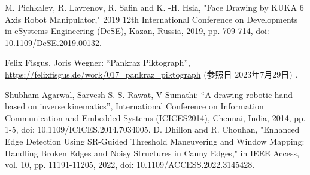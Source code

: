 \documentclass[10pt]{jarticle}
\begin{document}
    \vspace{5truemm}
    {\footnotesize
        \begin{thebibliography}{99}
            
            M. Pichkalev, R. Lavrenov, R. Safin and K. -H. Hsia, "Face Drawing by KUKA 6 Axis Robot Manipulator," 2019 12th International Conference on Developments in eSystems Engineering (DeSE), Kazan, Russia, 2019, pp. 709-714, doi: 10.1109/DeSE.2019.00132.

            Felix Fisgus, Joris Wegner: ``Pankraz Piktograph'', 
            \url{https://felixfisgus.de/work/017\_pankraz\_piktograph}
            (参照日 2023年7月29日) .
            
            Shubham Agarwal, Sarvesh S. S. Rawat, V Sumathi: ``A drawing robotic hand based on inverse kinematics'', 
            International Conference on Information Communication and Embedded Systems (ICICES2014), Chennai, India, 2014, pp. 1-5, doi: 10.1109/ICICES.2014.7034005.
		   D. Dhillon and R. Chouhan, "Enhanced Edge Detection Using SR-Guided Threshold Maneuvering and Window Mapping: Handling Broken Edges and Noisy Structures in Canny Edges," in IEEE Access, vol. 10, pp. 11191-11205, 2022, doi: 10.1109/ACCESS.2022.3145428.
            
        \end{thebibliography}
    }
    \normalsize
    
\end{document}
